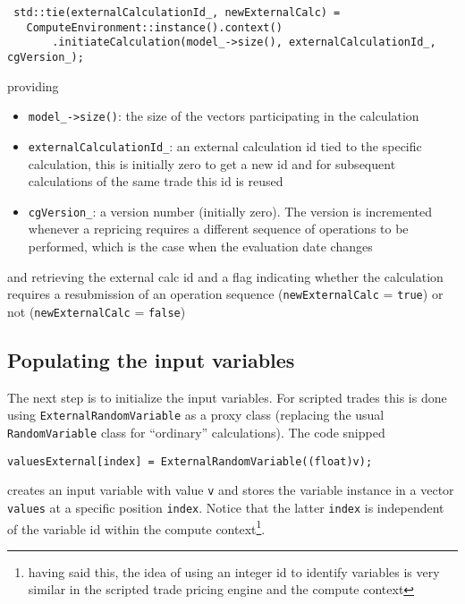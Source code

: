 \documentclass[12pt, a4paper]{article}
\begin{document}
\begin{verbatim}
 std::tie(externalCalculationId_, newExternalCalc) =
   ComputeEnvironment::instance().context()
       .initiateCalculation(model_->size(), externalCalculationId_, cgVersion_);
\end{verbatim}

providing

\begin{itemize}
\item \verb+model_->size()+: the size of the vectors participating in the calculation
\item \verb+externalCalculationId_+: an external calculation id tied to the specific calculation, this is initially zero
  to get a new id and for subsequent calculations of the same trade this id is reused
\item \verb+cgVersion_+: a version number (initially zero). The version is incremented whenever a repricing requires a
  different sequence of operations to be performed, which is the case when the evaluation date changes
\end{itemize}

and retrieving the external calc id and a flag indicating whether the calculation requires a resubmission of an
operation sequence (\verb+newExternalCalc+ = \verb+true+) or not (\verb+newExternalCalc+ = \verb+false+)

\subsection{Populating the input variables}

The next step is to initialize the input variables. For scripted trades this is done using \verb+ExternalRandomVariable+
as a proxy class (replacing the usual \verb+RandomVariable+ class for ``ordinary'' calculations). The code snipped

\begin{verbatim}
valuesExternal[index] = ExternalRandomVariable((float)v);
\end{verbatim}

creates an input variable with value \verb+v+ and stores the variable instance in a vector \verb+values+ at a specific
position \verb+index+. Notice that the latter \verb+index+ is independent of the variable id within the compute
context\footnote{having said this, the idea of using an integer id to identify variables is very similar in the scripted
trade pricing engine and the compute context}.
\end{document}
